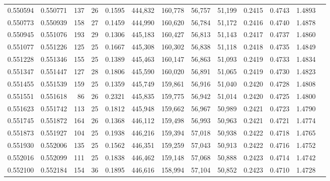 \begin{tabular}{rrrrrrrrrrrrr}
0.550594 & 0.550771 & 137 &  26 &                                     0.1595 & 444,832 & 160,778 &  56,757 &  51,199 & 0.2415 & 0.4743 & 1.4893 \\
0.550773 & 0.550939 & 158 &  27 &                                     0.1459 & 444,990 & 160,620 &  56,784 &  51,172 & 0.2416 & 0.4740 & 1.4878 \\
0.550945 & 0.551076 & 193 &  29 &                                     0.1306 & 445,183 & 160,427 &  56,813 &  51,143 & 0.2417 & 0.4737 & 1.4860 \\
0.551077 & 0.551226 & 125 &  25 &                                     0.1667 & 445,308 & 160,302 &  56,838 &  51,118 & 0.2418 & 0.4735 & 1.4849 \\
0.551228 & 0.551346 & 155 &  25 &                                     0.1389 & 445,463 & 160,147 &  56,863 &  51,093 & 0.2419 & 0.4733 & 1.4834 \\
0.551347 & 0.551447 & 127 &  28 &                                     0.1806 & 445,590 & 160,020 &  56,891 &  51,065 & 0.2419 & 0.4730 & 1.4823 \\
0.551455 & 0.551539 & 159 &  25 &                                     0.1359 & 445,749 & 159,861 &  56,916 &  51,040 & 0.2420 & 0.4728 & 1.4808 \\
0.551551 & 0.551618 &  86 &  26 &                                     0.2321 & 445,835 & 159,775 &  56,942 &  51,014 & 0.2420 & 0.4725 & 1.4800 \\
0.551623 & 0.551742 & 113 &  25 &                                     0.1812 & 445,948 & 159,662 &  56,967 &  50,989 & 0.2421 & 0.4723 & 1.4790 \\
0.551745 & 0.551872 & 164 &  26 &                                     0.1368 & 446,112 & 159,498 &  56,993 &  50,963 & 0.2421 & 0.4721 & 1.4774 \\
0.551873 & 0.551927 & 104 &  25 &                                     0.1938 & 446,216 & 159,394 &  57,018 &  50,938 & 0.2422 & 0.4718 & 1.4765 \\
0.551930 & 0.552006 & 135 &  25 &                                     0.1562 & 446,351 & 159,259 &  57,043 &  50,913 & 0.2422 & 0.4716 & 1.4752 \\
0.552016 & 0.552099 & 111 &  25 &                                     0.1838 & 446,462 & 159,148 &  57,068 &  50,888 & 0.2423 & 0.4714 & 1.4742 \\
0.552100 & 0.552184 & 154 &  36 &                                     0.1895 & 446,616 & 158,994 &  57,104 &  50,852 & 0.2423 & 0.4710 & 1.4728 \\

\end{tabular}
